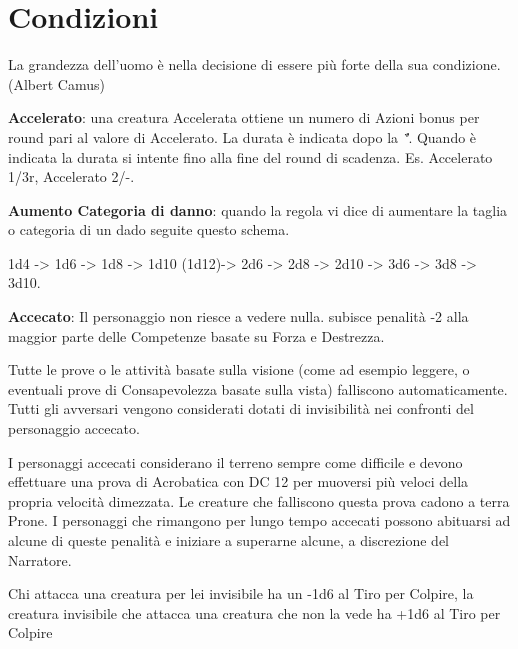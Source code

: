 \section{Condizioni}

\begin{changemargin}{0.3cm}{0.3cm}\begin{enfasi}{
La grandezza dell'uomo è nella decisione di essere più forte della sua condizione. (Albert Camus)}
\end{enfasi}\end{changemargin}\medskip

\begin{multicols}{2}

\label{condizioni}

\textbf{Accelerato}\hypertarget{Accelerato}{}\label{Accelerato}: una creatura Accelerata ottiene un numero di Azioni bonus per round pari al valore di Accelerato. La durata è indicata dopo la \emph{"\"}. Quando è indicata la durata si intente fino alla fine del round di scadenza. Es. Accelerato 1/3r, Accelerato 2/-.

\textbf{Aumento Categoria di danno}: quando la regola vi dice di aumentare la taglia o categoria di un dado seguite questo schema.

1d4 -> 1d6 -> 1d8 -> 1d10 (1d12)-> 2d6 -> 2d8 -> 2d10 -> 3d6 -> 3d8 -> 3d10.

\textbf{Accecato}: Il personaggio non riesce a vedere nulla. subisce penalità -2 alla maggior parte delle Competenze basate su Forza e Destrezza.

Tutte le prove o le attività basate sulla visione (come ad esempio leggere, o eventuali prove di Consapevolezza basate sulla vista) falliscono automaticamente. Tutti gli avversari vengono considerati dotati di invisibilità nei confronti del personaggio accecato.

I personaggi accecati considerano il terreno sempre come difficile e devono effettuare una prova di Acrobatica con DC 12 per muoversi più veloci della propria velocità dimezzata. Le creature che falliscono questa prova cadono a terra Prone. I personaggi che rimangono per lungo tempo accecati possono abituarsi ad alcune di queste penalità e iniziare a superarne alcune, a discrezione del Narratore.

Chi attacca una creatura per lei invisibile ha un -1d6 al Tiro per Colpire, la creatura invisibile che attacca una creatura che non la vede ha +1d6 al Tiro per Colpire


\end{multicols}
